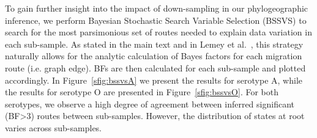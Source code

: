 \documentclass[a4paper,10pt]{article}
\begin{document}
To gain further insight into the impact of down-sampling in our phylogeographic inference, we perform Bayesian Stochastic Search Variable Selection (BSSVS) to search for the most parsimonious set of routes needed to explain data variation in each sub-sample.
As stated in the main text and in Lemey et al.~\cite{M-roots}, this strategy naturally allows for the analytic calculation of Bayes factors for each migration route (i.e. graph edge).
BFs are then calculated for each sub-sample and plotted accordingly.
In Figure~\ref{sfig:bssvsA} we present the results for serotype A, while the results for serotype O are presented in Figure~\ref{sfig:bssvsO}.
For both serotypes, we observe a high degree of agreement between inferred significant (BF>3) routes between sub-samples.
However, the distribution of states at root varies across sub-samples.



\end{document}
